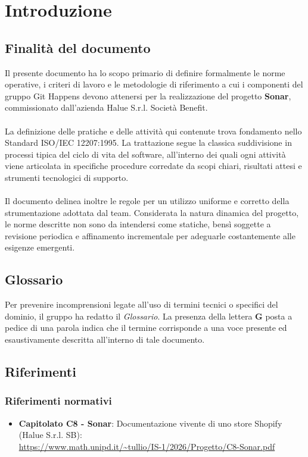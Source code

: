 \section{Introduzione}

\subsection{Finalità del documento}
Il presente documento ha lo scopo primario di definire formalmente le norme operative, i criteri di lavoro e le metodologie di riferimento a cui i componenti del gruppo Git Happens devono attenersi per la realizzazione del progetto \textbf{Sonar}, commissionato dall'azienda Halue S.r.l. Società Benefit. \\
\\
La definizione delle pratiche e delle attività qui contenute trova fondamento nello Standard ISO/IEC 12207:1995. La trattazione segue la classica suddivisione in processi tipica del ciclo di vita del software, all'interno dei quali ogni attività viene articolata in specifiche procedure corredate da scopi chiari, risultati attesi e strumenti tecnologici di supporto.\\
\\
Il documento delinea inoltre le regole per un utilizzo uniforme e corretto della strumentazione adottata dal team. Considerata la natura dinamica del progetto, le norme descritte non sono da intendersi come statiche, bensì soggette a revisione periodica e affinamento incrementale per adeguarle costantemente alle esigenze emergenti.

\subsection{Glossario}
Per prevenire incomprensioni legate all'uso di termini tecnici o specifici del dominio, il gruppo ha redatto il \textit{Glossario}. La presenza della lettera \textbf{G} posta a pedice di una parola indica che il termine corrisponde a una voce presente ed esaustivamente descritta all'interno di tale documento.

\subsection{Riferimenti}

\subsubsection{Riferimenti normativi}
\begin{itemize}
    \item \textbf{Capitolato C8 - Sonar}: Documentazione vivente di uno store Shopify (Halue S.r.l. SB):\\
    \url{https://www.math.unipd.it/~tullio/IS-1/2026/Progetto/C8-Sonar.pdf}\\
\end{itemize}

